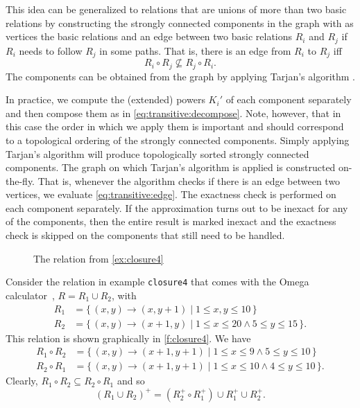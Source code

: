 This idea can be generalized to relations that are unions
of more than two basic relations by constructing the
strongly connected components in the graph with as vertices
the basic relations and an edge between two basic relations
$R_i$ and $R_j$ if $R_i$ needs to follow $R_j$ in some paths.
That is, there is an edge from $R_i$ to $R_j$ iff
\begin{equation}
\label{eq:transitive:edge}
R_i \circ R_j
\not\subseteq
R_j \circ R_i
.
\end{equation}
The components can be obtained from the graph by applying
Tarjan's algorithm .

In practice, we compute the (extended) powers $K_i'$ of each component
separately and then compose them as in \eqref{eq:transitive:decompose}.
Note, however, that in this case the order in which we apply them is
important and should correspond to a topological ordering of the
strongly connected components.  Simply applying Tarjan's
algorithm will produce topologically sorted strongly connected components.
The graph on which Tarjan's algorithm is applied is constructed on-the-fly.
That is, whenever the algorithm checks if there is an edge between
two vertices, we evaluate \eqref{eq:transitive:edge}.
The exactness check is performed on each component separately.
If the approximation turns out to be inexact for any of the components,
then the entire result is marked inexact and the exactness check
is skipped on the components that still need to be handled.

\begin{figure}
\begin{center}
\end{center}
\caption{The relation from \autoref{ex:closure4}}
\label{f:closure4}
\end{figure}
\begin{example}
\label{ex:closure4}
Consider the relation in example {\tt closure4} that comes with
the Omega calculator~, $R = R_1 \cup R_2$,
with
$$
\begin{aligned}
R_1 & = \{\, (x,y) \to (x,y+1) \mid 1 \le x,y \le 10 \,\}
\\
R_2 & = \{\, (x,y) \to (x+1,y) \mid 1 \le x \le 20 \wedge 5 \le y \le 15 \,\}
.
\end{aligned}
$$
This relation is shown graphically in \autoref{f:closure4}.
We have
$$
\begin{aligned}
R_1 \circ R_2 &=
\{\, (x,y) \to (x+1,y+1) \mid 1 \le x \le 9 \wedge 5 \le y \le 10 \,\}
\\
R_2 \circ R_1 &=
\{\, (x,y) \to (x+1,y+1) \mid 1 \le x \le 10 \wedge 4 \le y \le 10 \,\}
.
\end{aligned}
$$
Clearly, $R_1 \circ R_2 \subseteq R_2 \circ R_1$ and so
$$
\left(
R_1 \cup R_2
\right)^+
=
\left(R_2^+ \circ R_1^+\right)
\cup R_1^+
\cup R_2^+
.
$$
\end{example}

